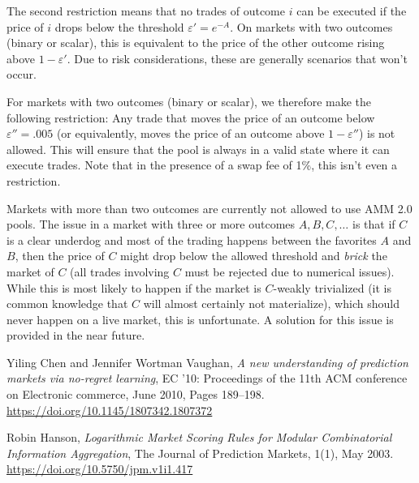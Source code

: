 \documentclass[12pt]{article}
\begin{document}
The second restriction means that no trades of outcome $i$ can be executed if the price of $i$ drops below the threshold $\varepsilon' = e^{-A}$. On markets with two outcomes (binary or scalar), this is equivalent to the price of the other outcome rising above $1 - \varepsilon'$. Due to risk considerations, these are generally scenarios that won't occur.

For markets with two outcomes (binary or scalar), we therefore make the following restriction: Any trade that moves the price of an outcome below $\varepsilon'' = .005$ (or equivalently, moves the price of an outcome above $1 - \varepsilon''$) is not allowed. This will ensure that the pool is always in a valid state where it can execute trades. Note that in the presence of a swap fee of 1\%, this isn't even a restriction.

Markets with more than two outcomes are currently not allowed to use AMM 2.0 pools. The issue in a market with three or more outcomes $A, B, C, \ldots$ is that if $C$ is a clear underdog and most of the trading happens between the favorites $A$ and $B$, then the price of $C$ might drop below the allowed threshold and \emph{brick} the market of $C$ (all trades involving $C$ must be rejected due to numerical issues). While this is most likely to happen if the market is $C$-weakly trivialized (it is common knowledge that $C$ will almost certainly not materialize), which should never happen on a live market, this is unfortunate. A solution for this issue is provided in the near future.

\newpage

\begin{thebibliography}{9}
      Yiling Chen and Jennifer Wortman Vaughan,
      \emph{A new understanding of prediction markets via no-regret learning},
      EC '10: Proceedings of the 11th ACM conference on Electronic commerce,
      June 2010, Pages 189–198.
      \url{https://doi.org/10.1145/1807342.1807372}

      Robin Hanson,
      \emph{Logarithmic Market Scoring Rules for Modular Combinatorial Information Aggregation},
      The Journal of Prediction Markets, 1(1),
      May 2003.
      \url{https://doi.org/10.5750/jpm.v1i1.417}
\end{thebibliography}
\end{document}
